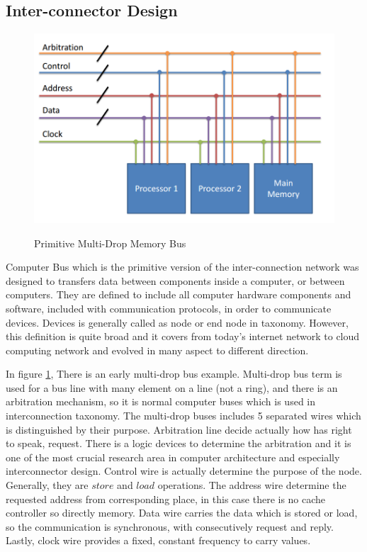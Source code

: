 \subsection{Inter-connector Design}
\begin{figure}[h!]
    \centering
    \includegraphics[width=1\textwidth]{bus_primatives.png}
    \caption{Primitive Multi-Drop Memory Bus }
    \cite{ComputerArchCoursera}
    \label{fig:bus_primative}
\end{figure}
Computer Bus which is the primitive version of the inter-connection network was designed to transfers data between components inside a computer, or between computers. They are defined to include all computer hardware components and software, included with communication protocols, in order to communicate devices. Devices is generally called as node or end node in taxonomy. However, this definition is quite broad and it covers from today's internet network to cloud computing network and evolved in many aspect to different direction.

In figure \ref{fig:bus_primative}, There is an early multi-drop bus example. Multi-drop bus term is used for a bus line with many element on a line (not a ring), and there is an arbitration mechanism, so it is normal computer buses which is used in interconnection taxonomy. The multi-drop buses includes 5 separated wires which is distinguished by their purpose. Arbitration line decide actually how has right to speak, request. There is a logic devices to determine the arbitration and it is one of the most crucial research area in computer architecture and especially interconnector design\cite{hennessy2012computer}. Control wire is actually determine the purpose of the node. Generally, they are $store$ and $load$ operations. The address wire determine the requested address from corresponding place, in this case there is no cache controller so directly memory. Data wire carries the data which is stored or load, so the communication is synchronous, with consecutively request and reply. Lastly, clock wire provides a fixed, constant frequency to carry values.\cite{hennessy2012computer}

